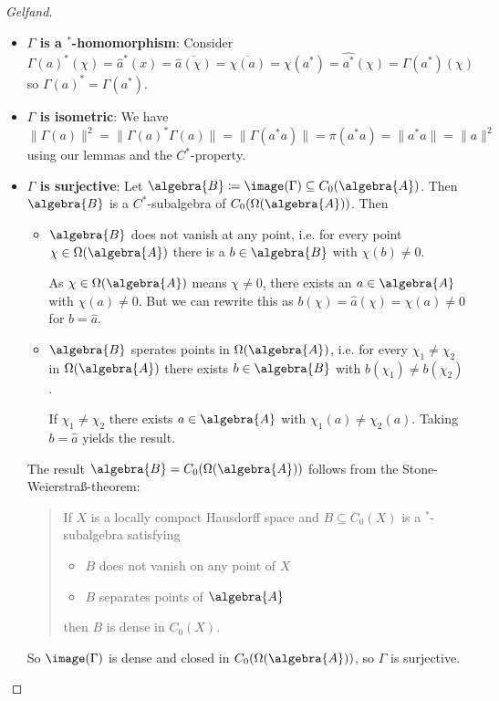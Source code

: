 \documentclass[a4paper]{article}
\begin{document}
\begin{proof}[Gelfand]~
	\begin{itemize}
		\item \textbf{$\Gamma$ is a $^*$-homomorphism}:
		Consider 
		\begin{equation*}
			\Gamma(a)^*(\chi) = \hat{a}^*(x) = \overline{\hat{a}(\chi)} = \overline{\chi(a)} = \chi(a^*) = \hat{a^*}(\chi) =  \Gamma(a^*)(\chi)
		\end{equation*}
		so $\Gamma(a)^* = \Gamma(a^*)$.
		\item \textbf{$\Gamma$ is isometric}:
		We have
		\begin{equation*}
			\|\Gamma(a)\|^2 = \|\Gamma(a)^* \Gamma(a)\| = \|\Gamma(a^* a)\| = \pi(a^* a) = \|a^* a\| = \|a\|^2
		\end{equation*}
		using our lemmas and the $C^*$-property.
		\item \textbf{$\Gamma$ is surjective}:
		Let $\algebra{B} \coloneq \image(\Gamma) \subseteq C_0(\algebra{A})$.
		Then $\algebra{B}$ is a $C^*$-subalgebra of $C_0(\Omega(\algebra{A}))$.
		Then
		\begin{itemize}
			\item $\algebra{B}$ does not vanish at any point, i.e. for every point $\chi \in \Omega(\algebra{A})$ there is a $b \in \algebra{B}$ with $\chi(b) \neq 0$. 
			
			As $\chi \in \Omega(\algebra{A})$ means $\chi \neq 0$, there exists an $a \in \algebra{A}$ with $\chi(a) \neq 0$.
			But we can rewrite this as $b(\chi) = \hat{a}(\chi) = \chi(a) \neq 0$ for $b = \hat{a}$.
			\item $\algebra{B}$ sperates points in $\Omega(\algebra{A})$, i.e. for every $\chi_1 \neq \chi_2$ in $\Omega(\algebra{A})$ there exists $b \in \algebra{B}$ with $b(\chi_1) \neq b(\chi_2)$.
			
			If $\chi_1 \neq \chi_2$ there exists $a \in \algebra{A}$ with $\chi_1(a) \neq \chi_2(a)$.
			Taking $b = \hat{a}$ yields the result.
		\end{itemize}
		The result $\algebra{B} = C_0(\Omega(\algebra{A}))$ follows from the Stone-Weierstraß-theorem:
		\begin{quote}
			If $X$ is a locally compact Hausdorff space and $B \subseteq C_0(X)$ is a $^*$-subalgebra satisfying
			\begin{itemize}
				\item $B$ does not vanish on any point of $X$
				\item $B$ separates points of $\algebra{A}$
			\end{itemize}
			then $B$ is dense in $C_0(X)$.
		\end{quote}
		So $\image(\Gamma)$ is dense and closed in $C_0(\Omega(\algebra{A}))$, so $\Gamma$ is surjective.
	\end{itemize}
\end{proof}
\end{document}
